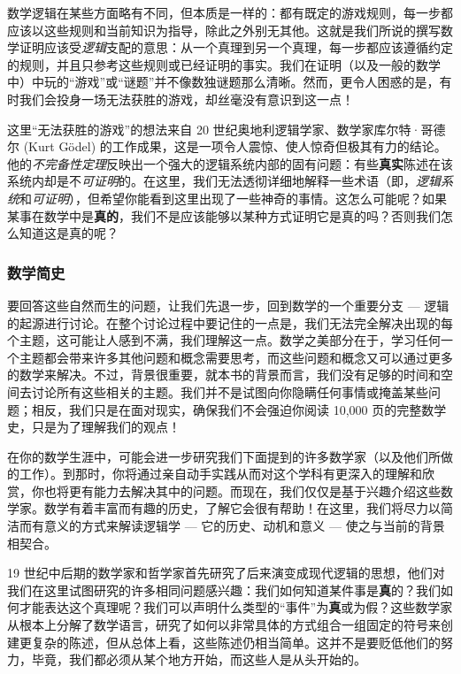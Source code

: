 数学逻辑在某些方面略有不同，但本质是一样的：都有既定的游戏规则，每一步都应该以这些规则和当前知识为指导，除此之外别无其他。这就是我们所说的撰写数学证明应该受\textit{逻辑}支配的意思：从一个真理到另一个真理，每一步都应该遵循约定的规则，并且只参考这些规则或已经证明的事实。我们在证明（以及一般的数学中）中玩的“游戏”或“谜题”并不像数独谜题那么清晰。然而，更令人困惑的是，有时我们会投身一场无法获胜的游戏，却丝毫没有意识到这一点！

这里“无法获胜的游戏”的想法来自 20 世纪奥地利逻辑学家、数学家库尔特·哥德尔 (Kurt Gödel) 的工作成果，这是一项令人震惊、使人惊奇但极其有力的结论。他的\textit{不完备性定理}反映出一个强大的逻辑系统内部的固有问题：有些\textbf{真实}陈述在该系统内却是不\textit{可证明}的。在这里，我们无法透彻详细地解释一些术语（即，\textit{逻辑系统}和\textit{可证明}），但希望你能看到这里出现了一些神奇的事情。这怎么可能呢？如果某事在数学中是\textbf{真的}，我们不是应该能够以某种方式证明它是真的吗？否则我们怎么知道这是真的呢？

\subsubsection*{数学简史}

要回答这些自然而生的问题，让我们先退一步，回到数学的一个重要分支 --- 逻辑的起源进行讨论。在整个讨论过程中要记住的一点是，我们无法完全解决出现的每个主题，这可能让人感到不满，我们理解这一点。数学之美部分在于，学习任何一个主题都会带来许多其他问题和概念需要思考，而这些问题和概念又可以通过更多的数学来解决。不过，背景很重要，就本书的背景而言，我们没有足够的时间和空间去讨论所有这些相关的主题。我们并不是试图向你隐瞒任何事情或掩盖某些问题；相反，我们只是在面对现实，确保我们不会强迫你阅读 10,000 页的完整数学史，只是为了理解我们的观点！

在你的数学生涯中，可能会进一步研究我们下面提到的许多数学家（以及他们所做的工作）。到那时，你将通过亲自动手实践从而对这个学科有更深入的理解和欣赏，你也将更有能力去解决其中的问题。而现在，我们仅仅是基于兴趣介绍这些数学家。数学有着丰富而有趣的历史，了解它会很有帮助！在这里，我们将尽力以简洁而有意义的方式来解读逻辑学 --- 它的历史、动机和意义 --- 使之与当前的背景相契合。

19 世纪中后期的数学家和哲学家首先研究了后来演变成现代逻辑的思想，他们对我们在这里试图研究的许多相同问题感兴趣：我们如何知道某件事是\textbf{真}的？我们如何才能表达这个真理呢？我们可以声明什么类型的“事件”为\textbf{真}或为假？这些数学家从根本上分解了数学语言，研究了如何以非常具体的方式组合一组固定的符号来创建更复杂的陈述，但从总体上看，这些陈述仍相当简单。这并不是要贬低他们的努力，毕竟，我们都必须从某个地方开始，而这些人是从头开始的。

